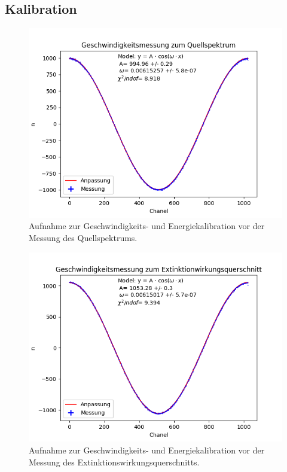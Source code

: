 \documentclass[12pt,a4paper]{article}
\begin{document}
\subsection{Kalibration}
\begin{figure} [H]
\centering
\includegraphics[scale=0.8]{Bilder/Kalibration/Quellspektrum.png}
\caption{Aufnahme zur Geschwindigkeits- und Energiekalibration vor der Messung des Quellspektrums.}
\end{figure}

\begin{figure} [H]
\centering
\includegraphics[scale=0.8]{Bilder/Kalibration/Extinktion.png}
\caption{Aufnahme zur Geschwindigkeits- und Energiekalibration vor der Messung des Extinktionswirkungsquerschnitts.}
\end{figure}
\end{document}
